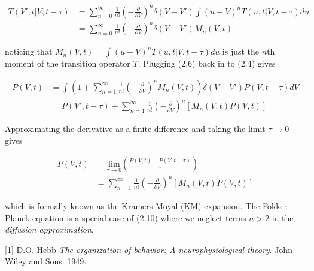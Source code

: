 \documentclass{ucetd}
\begin{document}
\begin{appendices}
\begin{align}
T(V', t | V, t-\tau) &= \sum_{n=0}^{\infty} \frac{1}{n!}\left(-\frac{\partial}{\partial V}\right)^{n}\delta(V-V')\int(u-V)^{n}T(u, t | V, t-\tau)du\\
&= \sum_{n=0}^{\infty} \frac{1}{n!}\left(-\frac{\partial}{\partial V}\right)^{n}\delta(V-V')M_{n}(V,t)
\end{align} 

noticing that $M_{n}(V,t) = \int(u-V)^{n}T(u, t | V, t-\tau)du$ is just the $n$th moment of the transition operator $T$. Plugging (2.6) back in to (2.4) gives 

\begin{align}
P(V, t) &= \int \left(1 + \sum_{n=1}^{\infty} \frac{1}{n!}\left(-\frac{\partial}{\partial V}\right)^{n} M_{n}(V,t)\right)\delta(V-V')P(V, t-\tau)dV\\
&= P(V', t-\tau) + \sum_{n=1}^{\infty} \frac{1}{n!}\left(-\frac{\partial}{\partial V}\right)^{n} \left[M_{n}(V,t)P(V,t)\right]
\end{align} 

Approximating the derivative as a finite difference and taking the limit $\tau\rightarrow 0$ gives

\begin{align}
\dot{P}(V,t)  &= \underset{\tau\rightarrow 0}{\mathrm{lim}}\left(\frac{P(V, t)-P(V, t-\tau)}{\tau}\right)\\
&= \sum_{n=1}^{\infty} \frac{1}{n!}\left(-\frac{\partial}{\partial V}\right)^{n} \left[M_{n}(V,t)P(V,t)\right]
\end{align} 

which is formally known as the Kramers-Moyal (KM) expansion. The Fokker-Planck equation is a special case of (2.10) where we neglect terms $n>2$ in the \emph{diffusion approximation}.
\end{appendices}

\makebibliography

[1] D.O. Hebb \textit{The organization of behavior: A neurophysiological theory}. John Wiley and Sons. 1949.

%
%
\end{document}

